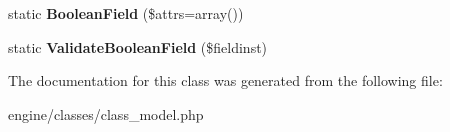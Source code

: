\begin{DoxyCompactItemize}
\item 
\hypertarget{classModel_af47f078690e96ef2602b7c3a6c68255e}{static {\bfseries Boolean\-Field} (\$attrs=array())}\label{classModel_af47f078690e96ef2602b7c3a6c68255e}

\item 
\hypertarget{classModel_aa6389e275a5d6206eb6bea93b72c1b2b}{static {\bfseries Validate\-Boolean\-Field} (\$fieldinst)}\label{classModel_aa6389e275a5d6206eb6bea93b72c1b2b}

\end{DoxyCompactItemize}


The documentation for this class was generated from the following file\-:\begin{DoxyCompactItemize}
\item 
engine/classes/class\-\_\-model.\-php\end{DoxyCompactItemize}
